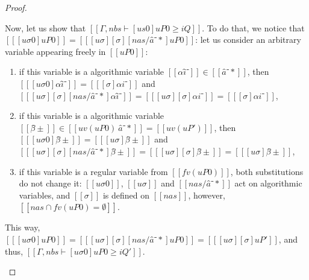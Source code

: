 \begin{proof}
\begin{caseof}
            Now, let us show that $[[Γ, nbs ⊢ [us0]uP0 ≥ iQ]]$.
            To do that, we notice that\\ $[[ [uσ0]uP0 ]] = [[ [uσ][σ][nas/â⁻*]uP0 ]]$:
            let us consider an arbitrary variable appearing freely in $[[uP0]]$:
            \begin{enumerate}
                \item if this variable is a algorithmic variable $[[αî⁻]] \in [[â⁻*]]$, then
                $[[ [uσ0]αî⁻ ]] = [[ [σ]αi⁻ ]]$ and\\
                $[[ [uσ][σ][nas/â⁻*]αî⁻ ]] = [[ [uσ][σ]αi⁻ ]] = [[ [σ]αi⁻ ]]$,
                \item if this variable is a algorithmic variable $[[β̂±]] \in [[ uv(uP0) \ {â⁻*} ]] = [[uv(uP')]]$, then
                $[[ [uσ0]β̂± ]] = [[ [uσ]β̂± ]]$ and $[[ [uσ][σ][nas/â⁻*]β̂± ]] = [[ [uσ][σ]β̂± ]] = [[ [uσ]β̂± ]]$,
                \item if this variable is a regular variable from $[[fv(uP0)]]$, both substitutions do not change it:
                $[[ uσ0 ]]$, $[[ uσ ]]$ and $[[ nas / â⁻* ]]$ act on algorithmic variables, 
                and $[[σ]]$ is defined on $[[nas]]$, however, $[[{nas} ∩ fv(uP0) = ∅]]$.
            \end{enumerate}
            This way, $[[ [uσ0]uP0 ]] = [[ [uσ][σ][nas/â⁻*]uP0 ]] = [[ [uσ][σ]uP' ]]$,
            and thus, $[[ Γ, nbs ⊢ [uσ0]uP0 ≥ iQ' ]]$.
    \end{caseof}
\end{proof}
